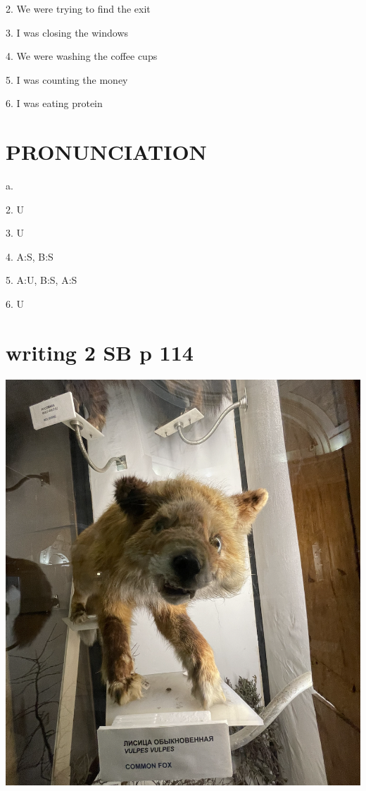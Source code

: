 \documentclass{article}
\begin{document}
2. We were trying to find the exit

3. I was closing the windows

4. We were washing the coffee cups

5. I was counting the money

6. I was eating protein
\section{PRONUNCIATION}
a.

2. U

3. U

4. A:S, B:S

5. A:U, B:S, A:S

6. U
\section{writing 2 SB p 114}
\begin{minipage}{.5\textwidth}
    \includegraphics[width=1\textwidth]{fox.png} 
\end{minipage}
\hfill
\end{document}

